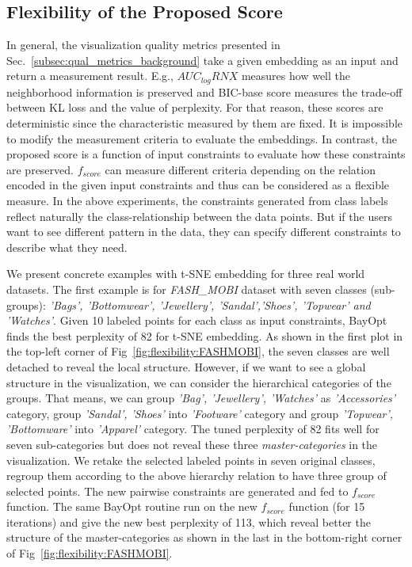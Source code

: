 \subsection{Flexibility of the Proposed Score}\label{sec:result:flexibility}
In general, the visualization quality metrics presented in Sec.~\ref{subsec:qual_metrics_background} take a given embedding as an input and return a measurement result.
E.g., $AUC_{log}RNX$ measures how well the neighborhood information is preserved and BIC-base score measures the trade-off between KL loss and the value of perplexity.
For that reason, these scores are deterministic since the characteristic measured by them are fixed.
It is impossible to modify the measurement criteria to evaluate the embeddings.
In contrast, the proposed score is a function of input constraints to evaluate how these constraints are preserved.
$f_{score}$ can measure different criteria depending on the relation encoded in the given input constraints and thus can be considered as a flexible measure.
In the above experiments, the constraints generated from class labels reflect naturally the class-relationship between the data points.
But if the users want to see different pattern in the data, they can specify different constraints to describe what they need.

We present concrete examples with t-SNE embedding for three real world datasets.
The first example is for \emph{FASH\_MOBI} dataset with seven classes (sub-groups): \emph{’Bags’, ’Bottomwear’, ’Jewellery’, ’Sandal’,’Shoes’, ’Topwear’ and ’Watches’}.
Given 10 labeled points for each class as input constraints, BayOpt finds the best perplexity of 82 for t-SNE embedding.
As shown in the first plot in the top-left corner of Fig~\ref{fig:flexibility:FASHMOBI}, the seven classes are well detached to reveal the local structure.
However, if we want to see a global structure in the visualization, we can consider the hierarchical categories of the groups.
That means, we can group \emph{'Bag', 'Jewellery', 'Watches'} as \emph{'Accessories'} category, group \emph{'Sandal', 'Shoes'} into \emph{'Footware'} category and group \emph{'Topwear', 'Bottomware'} into \emph{'Apparel'} category.
The tuned perplexity of 82 fits well for seven sub-categories but does not reveal these three \emph{master-categories} in the visualization.
We retake the selected labeled points in seven original classes, regroup them according to the above hierarchy relation to have three group of selected points.
The new pairwise constraints are generated and fed to $f_{score}$ function.
The same BayOpt routine run on the new $f_{score}$ function (for 15 iterations) and give the new best perplexity of 113, which reveal better the structure of the master-categories as shown in the last in the bottom-right corner of Fig~\ref{fig:flexibility:FASHMOBI}.

